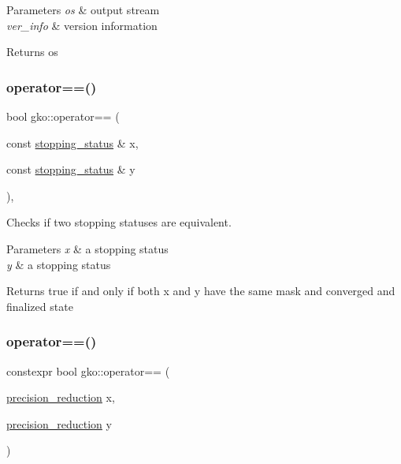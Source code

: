\begin{DoxyParams}{Parameters}
{\em os} & output stream \\
\hline
{\em ver\+\_\+info} & version information\\
\hline
\end{DoxyParams}
\begin{DoxyReturn}{Returns}
os 
\end{DoxyReturn}
\mbox{\label{namespacegko_acf34f605deac3e475189bb5b8a0fa71a}} 
\subsubsection{\texorpdfstring{operator==()}{operator==()}\hspace{0.1cm}{\footnotesize\ttfamily [1/2]}}
{\footnotesize\ttfamily bool gko\+::operator== (\begin{DoxyParamCaption}\item[{const \hyperlink{classgko_1_1stopping__status}{stopping\+\_\+status} \&}]{x,  }\item[{const \hyperlink{classgko_1_1stopping__status}{stopping\+\_\+status} \&}]{y }\end{DoxyParamCaption})\hspace{0.3cm}{\ttfamily [inline]}, {\ttfamily [noexcept]}}



Checks if two stopping statuses are equivalent. 


\begin{DoxyParams}{Parameters}
{\em x} & a stopping status \\
\hline
{\em y} & a stopping status\\
\hline
\end{DoxyParams}
\begin{DoxyReturn}{Returns}
true if and only if both {\ttfamily x} and {\ttfamily y} have the same mask and converged and finalized state 
\end{DoxyReturn}
\mbox{\label{namespacegko_a4dbafa6e062c2036991ec8c3f6b201cf}} 
\subsubsection{\texorpdfstring{operator==()}{operator==()}\hspace{0.1cm}{\footnotesize\ttfamily [2/2]}}
{\footnotesize\ttfamily constexpr bool gko\+::operator== (\begin{DoxyParamCaption}\item[{\hyperlink{classgko_1_1precision__reduction}{precision\+\_\+reduction}}]{x,  }\item[{\hyperlink{classgko_1_1precision__reduction}{precision\+\_\+reduction}}]{y }\end{DoxyParamCaption})\hspace{0.3cm}{\ttfamily [noexcept]}}



